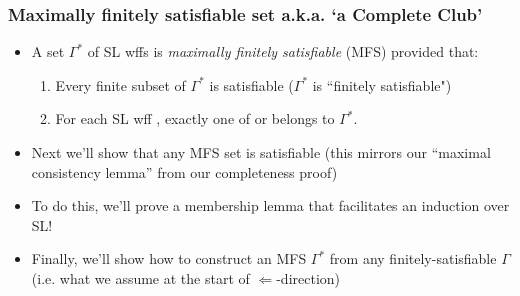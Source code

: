 \begin{frame}
\frametitle{Maximally finitely satisfiable set a.k.a. `a Complete Club'}

\begin{itemize}[<+->]

\item A set $\Gamma^{\ast}$ of SL wffs is \emph{maximally finitely satisfiable} (MFS) provided that:

\begin{enumerate}[1.)]

\item Every finite subset of $\Gamma^{\ast}$ is satisfiable ($\Gamma^{\ast}$ is ``finitely satisfiable")

\item For each SL wff , exactly one of  or \enot{} belongs to $\Gamma^{\ast}$. 



\end{enumerate} 

\bigskip

\item Next we'll show that any MFS set is satisfiable (this mirrors our ``maximal consistency lemma'' from our completeness proof)

\item To do this, we'll prove a membership lemma that facilitates an induction over SL! 

\item Finally, we'll show how to construct an MFS $\Gamma^{\ast}$ from any finitely-satisfiable $\Gamma$ (i.e. what we assume at the start of $\Leftarrow$-direction)

\end{itemize}
\end{frame}

